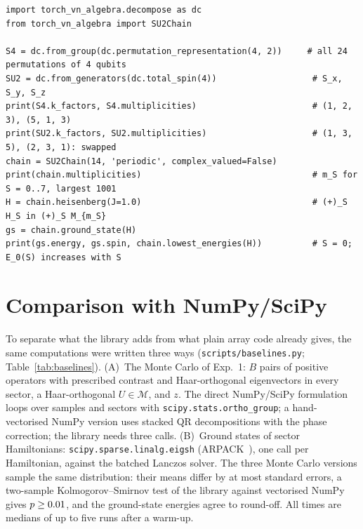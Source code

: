 \documentclass[11pt]{article}
\newcommand{\M}{\mathcal{M}}
\providecommand{\BaseMinKS}{--}\providecommand{\BoundsStChecked}{--}\providecommand{\BoundsStOutside}{--}\providecommand{\BoundsShortfall}{--}
\begin{document}
\begin{lstlisting}[caption={Schur--Weyl duality from the symmetries alone, and the SU(2) blocks of a Heisenberg ring (cf.\ \texttt{examples/example\_decompose.py} and \texttt{example\_su2.py}).},label=lst:symmetry]
import torch_vn_algebra.decompose as dc
from torch_vn_algebra import SU2Chain

S4 = dc.from_group(dc.permutation_representation(4, 2))     # all 24 permutations of 4 qubits
SU2 = dc.from_generators(dc.total_spin(4))                   # S_x, S_y, S_z
print(S4.k_factors, S4.multiplicities)                       # (1, 2, 3), (5, 1, 3)
print(SU2.k_factors, SU2.multiplicities)                     # (1, 3, 5), (2, 3, 1): swapped
chain = SU2Chain(14, 'periodic', complex_valued=False)
print(chain.multiplicities)                                  # m_S for S = 0..7, largest 1001
H = chain.heisenberg(J=1.0)                                  # (+)_S H_S in (+)_S M_{m_S}
gs = chain.ground_state(H)
print(gs.energy, gs.spin, chain.lowest_energies(H))          # S = 0; E_0(S) increases with S
\end{lstlisting}

\section{Comparison with NumPy/SciPy}\label{sec:baselines}

To separate what the library adds from what plain array code already gives, the same computations were written
three ways (\texttt{scripts/baselines.py}; Table~\ref{tab:baselines}). (A)~The Monte Carlo of Exp.~1: $B$ pairs of
positive operators with prescribed contrast and Haar-orthogonal eigenvectors in every sector, a Haar-orthogonal $U\in\M$,
and $z$. The direct NumPy/SciPy formulation loops over samples and sectors with \texttt{scipy.stats.ortho\_group};
a hand-vectorised NumPy version uses stacked QR decompositions with the phase correction; the library needs three
calls. (B)~Ground states of sector Hamiltonians: \texttt{scipy.sparse.linalg.eigsh} (ARPACK~\cite{lehoucq1998}), one
call per Hamiltonian, against the batched Lanczos solver. The three Monte Carlo versions sample the same distribution:
their means differ by at most  standard errors, a two-sample
Kolmogorov--Smirnov test of the library against vectorised NumPy gives $p\ge\IfFileExists{generated/baselines.tex}{\BaseMinKS}{0.01}$,
and the ground-state energies agree to round-off. All times are medians of up to five runs after a warm-up.
\end{document}
